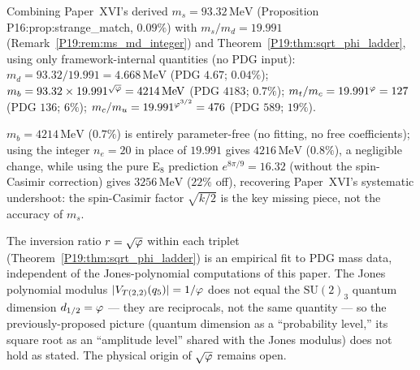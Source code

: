 \begin{corollary}
\label{P19:cor:absolute_masses}
Combining Paper~XVI's derived $m_s=93.32\,\mathrm{MeV}$ (Proposition~%
P16:prop:strange\_match, $0.09\%$) with $m_s/m_d=19.991$
(Remark~\ref{P19:rem:ms_md_integer}) and
Theorem~\ref{P19:thm:sqrt_phi_ladder}, using only
framework-internal quantities (no PDG input):
$m_d=93.32/19.991=4.668\,\mathrm{MeV}$ (PDG $4.67$; $0.04\%$);
$m_b=93.32\times19.991^{\sqrt{\varphi}}=4214\,\mathrm{MeV}$ (PDG $4183$;
$0.7\%$); $m_t/m_c=19.991^{\varphi}=127$ (PDG $136$; $6\%$);
$m_c/m_u=19.991^{\varphi^{3/2}}=476$ (PDG $589$; $19\%$).
\end{corollary}

\begin{remark}
\label{P19:rem:mb_prediction}
$m_b=4214\,\mathrm{MeV}$ ($0.7\%$) is entirely parameter-free (no
fitting, no free coefficients); using the integer $n_e=20$ in place
of $19.991$ gives $4216\,\mathrm{MeV}$ ($0.8\%$), a negligible change,
while using the pure E$_8$ prediction $e^{8\pi/9}=16.32$ (without the
spin-Casimir correction) gives $3256\,\mathrm{MeV}$ ($22\%$ off),
recovering Paper~XVI's systematic undershoot: the spin-Casimir factor
$\sqrt{k/2}$ is the key missing piece, not the accuracy of $m_s$.
\end{remark}

\begin{remark}
\label{P19:rem:sqrt_phi_meaning}
The inversion ratio $r=\sqrt{\varphi}$ within each triplet
(Theorem~\ref{P19:thm:sqrt_phi_ladder}) is an empirical fit to PDG
mass data, independent of the Jones-polynomial computations of this
paper. The Jones polynomial modulus $|V_{T(2,2)}(q_5)|=1/\varphi$
does not equal the $\mathrm{SU}(2)_3$ quantum dimension $d_{1/2}=\varphi$
--- they are reciprocals, not the same quantity --- so the
previously-proposed picture (quantum dimension as a ``probability
level,'' its square root as an ``amplitude level'' shared with the
Jones modulus) does not hold as stated. The physical origin of
$\sqrt{\varphi}$ remains open.
\end{remark}

